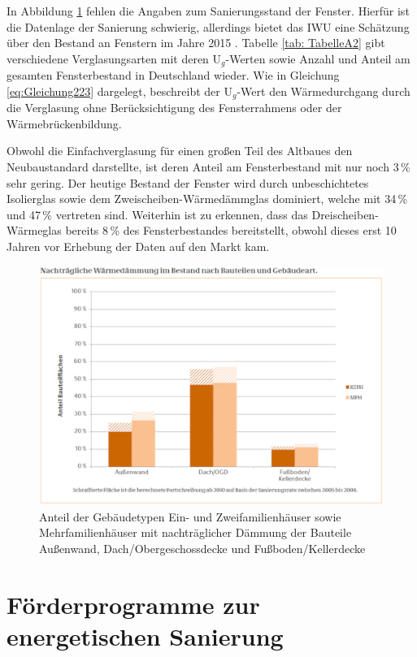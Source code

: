 In Abbildung \ref{fig: Abbildung231} fehlen die Angaben zum Sanierungsstand der Fenster.
Hierfür ist die Datenlage der Sanierung schwierig, allerdings bietet das IWU eine Schätzung über den Bestand an Fenstern im Jahre 2015 \cite{Bigalke.2016}.
Tabelle \ref{tab: TabelleA2} gibt verschiedene Verglasungsarten mit deren U\(_g\)-Werten sowie Anzahl und Anteil am gesamten Fensterbestand in Deutschland wieder.
Wie in Gleichung \ref{eq:Gleichung223} dargelegt, beschreibt der U\(_g\)-Wert den Wärmedurchgang durch die Verglasung ohne Berücksichtigung des Fensterrahmens oder der Wärmebrückenbildung.

Obwohl die Einfachverglasung für einen großen Teil des Altbaues den Neubaustandard darstellte, ist deren Anteil am Fensterbestand mit nur noch 3\,\% sehr gering. 
Der heutige Bestand der Fenster wird durch unbeschichtetes Isolierglas sowie dem Zweischeiben-Wärmedämmglas dominiert, welche mit 34\,\% und 47\,\% vertreten sind.
Weiterhin ist zu erkennen, dass das Dreischeiben-Wärmeglas bereits 8\,\% des Fensterbestandes bereitstellt, obwohl dieses erst 10 Jahren vor Erhebung der Daten auf den Markt kam.

\begin{figure}[H]
	\centering
		\includegraphics{Pictures/NachtraeglicheSanierung.jpg}
	\caption{Anteil der Gebäudetypen Ein- und Zweifamilienhäuser sowie Mehrfamilienhäuser mit nachträglicher Dämmung der Bauteile Außenwand, Dach/Obergeschossdecke und Fußboden/Kellerdecke \cite{Bigalke.2016}}
	\label{fig: Abbildung231} 
\end{figure}

\section{Förderprogramme zur energetischen Sanierung}
\label{sec:Sektion 24}


